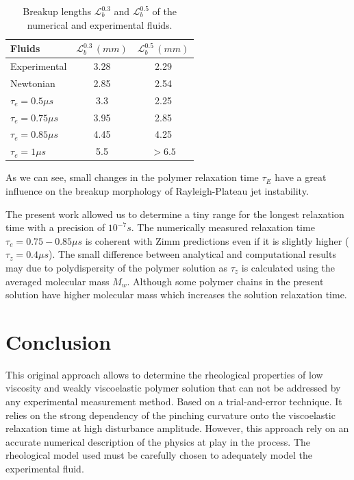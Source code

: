 \documentclass[twocolumn,10pt]{asme2ej}
\begin{document}
\begin{table}[H]
    \begin{center}
        \begin{tabular}{l|cc}
            Fluids & $\mathcal{L}^{0.3}_b\,(mm)$ &$\mathcal{L}^{0.5}_b\,(mm)$\\
            \hline
            Experimental  & 3.28  &2.29 \\
            Newtonian & 2.85 & 2.54\\ 
            $\tau_e = 0.5\mu s$ & 3.3 & 2.25\\ 
            $\tau_e = 0.75\mu s$ & 3.95 & 2.85\\ 
            $\tau_e = 0.85\mu s$ & 4.45 & 4.25\\ 
            $\tau_e = 1\mu s$ & 5.5 & $> 6.5$\\ 
            \hline
        \end{tabular}
    \end{center}
    \label{tab:lbInk}
    \caption{Breakup lengths $\mathcal{L}^{0.3}_b$ and $\mathcal{L}^{0.5}_b$ of the numerical and experimental fluids.}
\end{table}


As we can see, small changes in the polymer relaxation time $\tau_E$ have a great influence on the breakup morphology of Rayleigh-Plateau jet instability. 

The present work allowed us to determine a tiny range for the longest relaxation time with a precision of $10^{-7} s$. The numerically measured relaxation time $\tau_e = 0.75-0.85 \mu s$ is coherent with Zimm predictions even if it is slightly higher ($\tau_z = 0.4 \mu s$).  The small difference between analytical and computational results may due to polydispersity of the polymer solution as $\tau_z$ is calculated using the averaged molecular mass $M_w$. Although some polymer chains in the present solution have higher molecular mass which increases the solution relaxation time.

\section{Conclusion}
This original approach allows to determine the rheological properties of low viscosity and weakly viscoelastic polymer solution that can not be addressed by any experimental measurement method. Based on a trial-and-error technique. It relies on the strong dependency of the pinching curvature onto the viscoelastic relaxation time at high disturbance amplitude. However, this approach rely on an accurate numerical description of the physics at play in the process. The rheological model used must be carefully chosen to adequately model the experimental fluid.
\end{document}
